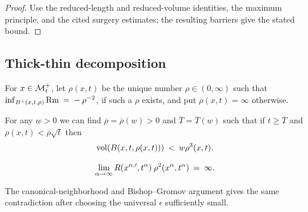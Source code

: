 \begin{proof}
\sketch Use the reduced-length and reduced-volume identities, the maximum principle, and the cited surgery estimates; the resulting barriers give the stated bound.
\end{proof}

\subsection{Thick-thin decomposition}

\begin{definition}
  \label{def:kl-thick-thin-decomposition-curvature-scale}

For $x \in {\mathcal M}_t^+$,
let $\rho(x,t)$ be the unique number $\rho\in (0,\infty)$ such that
$\inf_{B^+(x,t, \rho)} \operatorname{Rm} \: = \: - \: \rho^{-2}$, if such a $\rho$ exists,
and put $\rho(x,t)=\infty$ otherwise.
\end{definition}

\begin{lemma}
  \label{lem:kl-thick-thin-decomposition-thick-thin-geometry-lemma}
 \label{bigenough}
For any $w > 0$ we can find $\overline{\rho} = \overline{\rho}(w) > 0$
and $\overline{T}=\overline{T}(w)$
such that if $t\geq \overline{T}$ and $\rho(x,t) < \overline{\rho} \sqrt{t}$ then
\begin{equation}
\operatorname{vol}(B(x,t,\rho(x,t))) \: < \: w \rho^3(x,t).
\end{equation}
\end{lemma}

\begin{equation} \label{Rblowup}
\lim_{\alpha \rightarrow \infty}
R(x^{\alpha,\prime}, t^\alpha) \: \rho^2(x^\alpha, t^\alpha) \: = \: \infty.
\end{equation}

\begin{remark}
\label{rem:kl-thick-thin-decomposition-estimates-canonical-neighborhoods}


The canonical-neighborhood and Bishop--Gromov argument gives the same contradiction after choosing the universal $\epsilon$ sufficiently small.
\end{remark}


